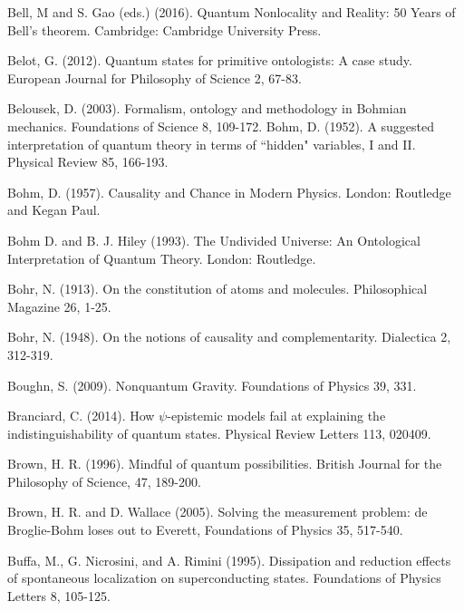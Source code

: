 \begin{thebibliography}{}
\bibitem{} Bell, M and S. Gao (eds.) (2016). Quantum Nonlocality and Reality: 50 Years of Bell’s theorem. Cambridge: Cambridge University Press.

\bibitem{} Belot, G. (2012). Quantum states for primitive ontologists: A case study. European Journal for
Philosophy of Science 2, 67-83.

\bibitem{} Belousek, D. (2003). Formalism, ontology and methodology in Bohmian mechanics. Foundations of Science 8, 109-172.
\bibitem{} Bohm, D. (1952). A suggested interpretation of quantum theory in terms of ``hidden" variables, I and II. Physical Review 85, 166-193.

\bibitem{} Bohm, D. (1957). Causality and Chance in Modern Physics. London: Routledge and Kegan Paul.

\bibitem{} Bohm D. and B. J. Hiley (1993). The Undivided Universe: An Ontological Interpretation of Quantum Theory. London: Routledge.

\bibitem{} Bohr, N. (1913). On the constitution of atoms and molecules. Philosophical Magazine 26, 1-25.

\bibitem{} Bohr, N. (1948). On the notions of causality and complementarity. Dialectica 2, 312-319.



\bibitem{} Boughn, S. (2009). Nonquantum Gravity. Foundations of Physics 39, 331.

\bibitem{} Branciard, C. (2014). How $\psi$-epistemic models fail at explaining the indistinguishability of quantum states. Physical Review Letters 113, 020409.

\bibitem{}  Brown, H. R. (1996). Mindful of quantum possibilities. British Journal for the Philosophy of Science, 47, 189-200.


\bibitem{} Brown, H. R. and D. Wallace (2005). Solving the measurement problem: de Broglie-Bohm loses out to Everett, Foundations of Physics 35, 517-540.

\bibitem{} Buffa, M., G. Nicrosini, and A. Rimini (1995). Dissipation and reduction effects of spontaneous
localization on superconducting states. Foundations of Physics  Letters 8, 105-125.


\end{thebibliography}
